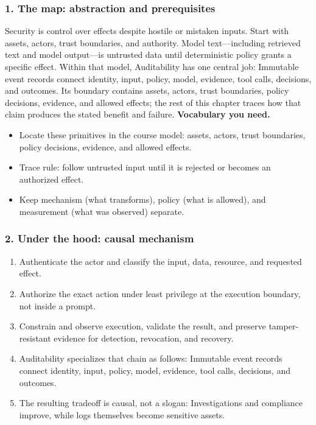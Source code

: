 \subsubsection*{1. The map: abstraction and prerequisites}
Security is control over effects despite hostile or mistaken inputs. Start with assets, actors, trust boundaries, and authority. Model text—including retrieved text and model output—is untrusted data until deterministic policy grants a specific effect.
Within that model, Auditability has one central job: Immutable event records connect identity, input, policy, model, evidence, tool calls, decisions, and outcomes. Its boundary contains assets, actors, trust boundaries, policy decisions, evidence, and allowed effects; the rest of this chapter traces how that claim produces the stated benefit and failure.
\textbf{Vocabulary you need.}\begin{itemize}
\item Locate these primitives in the course model: assets, actors, trust boundaries, policy decisions, evidence, and allowed effects.
\item Trace rule: follow untrusted input until it is rejected or becomes an authorized effect.
\item Keep mechanism (what transforms), policy (what is allowed), and measurement (what was observed) separate.
\end{itemize}
\subsubsection*{2. Under the hood: causal mechanism}\begin{enumerate}
\item Authenticate the actor and classify the input, data, resource, and requested effect.
\item Authorize the exact action under least privilege at the execution boundary, not inside a prompt.
\item Constrain and observe execution, validate the result, and preserve tamper-resistant evidence for detection, revocation, and recovery.
\item Auditability specializes that chain as follows: Immutable event records connect identity, input, policy, model, evidence, tool calls, decisions, and outcomes.
\item The resulting tradeoff is causal, not a slogan: Investigations and compliance improve, while logs themselves become sensitive assets.
\end{enumerate}
